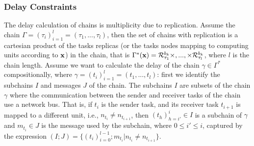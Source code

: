 \subsubsection{Delay  Constraints}
The delay calculation of chains is multiplicity due to replication. Assume the chain $\Gamma=(\tau_i)_{i=1}^l=(\tau_1,...,\tau_l)$, then the set of chains with replication is a cartesian product of the tasks replicas (or the tasks nodes mapping to computing units according to $\textbf{x}$) in the chain, that is $\Gamma^*(\x)= \sss{\mathcal{R}}[k][\tau_1][b]\times,...,\times\sss{\mathcal{R}}[k][\tau_l][b]$, where $l$ is the chain length. Assume we want to calculate the delay of the chain $\gamma\in \Gamma^*$ compositionally, where $\gamma=(t_i)_{i=1}^l=(t_1,...,t_l)$: first we identify the subchains $I$ and messages $J$ of the chain. The subchains $I$ are subsets of the chain $\gamma$ where the communication between the sender and receiver tasks of the chain use a network bus. That is, if $t_i$ is the sender task, and its receiver task $t_{i+1}$ is mapped to a different unit, i.e., $n_{t_i}\neq n_{t_{i+1}}$, then $(t_h)_{h=i'}^i\in I$ is a subchain of $\gamma$ and $m_{t_i}\in J$ is the message used by the subchain, where $0\leq i'\leq i$, captured by the expression
$
	(I;J)=\{(t_i)_{i=0}^{l-1};m_{t_i} | n_{t_i}\neq n_{t_{i+1}}\}
$.
	
